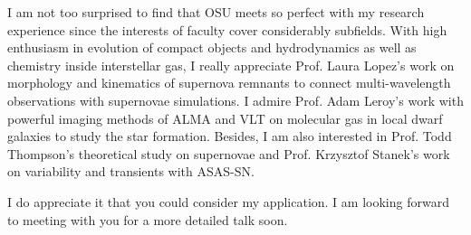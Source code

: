 \documentclass[11pt, a4paper]{awesome-cv} %
\begin{document}
\begin{cvletter}
I am not too surprised to find that OSU meets so perfect with my research experience since the interests of faculty cover considerably subfields. With high enthusiasm in evolution of compact objects and hydrodynamics as well as chemistry inside interstellar gas, I really appreciate Prof. Laura Lopez's work on morphology and kinematics of supernova remnants to connect multi-wavelength observations with supernovae simulations. I admire Prof. Adam Leroy's work with powerful imaging methods of ALMA and VLT on molecular gas in local dwarf galaxies to study the star formation. Besides, I am also interested in Prof. Todd Thompson's theoretical study on supernovae and Prof. Krzysztof Stanek's work on variability and transients with ASAS-SN.

I do appreciate it that you could consider my application. I am looking forward to meeting with you for a more detailed talk soon.

\end{cvletter}


\end{document}
